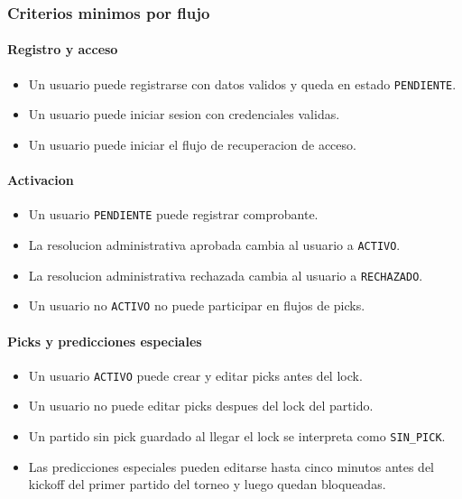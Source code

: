 \subsubsection{Criterios minimos por flujo}

\paragraph{Registro y acceso}

\begin{itemize}
  \item Un usuario puede registrarse con datos validos y queda en estado \texttt{PENDIENTE}.
  \item Un usuario puede iniciar sesion con credenciales validas.
  \item Un usuario puede iniciar el flujo de recuperacion de acceso.
\end{itemize}

\paragraph{Activacion}

\begin{itemize}
  \item Un usuario \texttt{PENDIENTE} puede registrar comprobante.
  \item La resolucion administrativa aprobada cambia al usuario a \texttt{ACTIVO}.
  \item La resolucion administrativa rechazada cambia al usuario a \texttt{RECHAZADO}.
  \item Un usuario no \texttt{ACTIVO} no puede participar en flujos de picks.
\end{itemize}

\paragraph{Picks y predicciones especiales}

\begin{itemize}
  \item Un usuario \texttt{ACTIVO} puede crear y editar picks antes del lock.
  \item Un usuario no puede editar picks despues del lock del partido.
  \item Un partido sin pick guardado al llegar el lock se interpreta como \texttt{SIN\_PICK}.
  \item Las predicciones especiales pueden editarse hasta cinco minutos antes del kickoff del primer partido del torneo y luego quedan bloqueadas.
\end{itemize}

